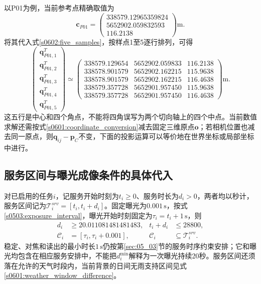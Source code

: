 以P01为例，当前参考点精确取值为
\begin{equation}
 \mathbf c_{P01}=
 \begin{pmatrix}
 338579.12965359824\\
 5652902.059832593\\
 116.2138
 \end{pmatrix}\mathrm m.
 \label{s0602:p01_center}
\end{equation}
将其代入式\eqref{s0602:five_samples}，按样点1至5逐行排列，可得
\begin{equation}
 \begin{pmatrix}
 \mathbf q_{P01,1}^T\\
 \mathbf q_{P01,2}^T\\
 \mathbf q_{P01,3}^T\\
 \mathbf q_{P01,4}^T\\
 \mathbf q_{P01,5}^T
 \end{pmatrix}
 \simeq
 \begin{pmatrix}
 338579.129654&5652902.059833&116.2138\\
 338578.901579&5652902.162215&115.9638\\
 338578.901579&5652902.162215&116.4638\\
 338579.357728&5652901.957450&115.9638\\
 338579.357728&5652901.957450&116.4638
 \end{pmatrix}\mathrm m.
 \label{s0602:p01_samples}
\end{equation}
这五行是中心和四个角点，不能将四角误写为两个切向轴上的四个中点。当前数值求解还需按式\eqref{s0601:coordinate_conversion}减去固定三维原点$\mathbf o$；若相机位置也减去同一原点，则$\mathbf q_{ij}-\mathbf p_C$不变，下面的投影运算可以等价地在世界坐标或局部坐标中进行。

\subsection{服务区间与曝光成像条件的具体代入}

对已启用的任务$i$，记服务开始时刻为$t_i\ge0$、服务时长为$d_i>0$，两者均以秒计，服务区间记为$\mathcal T_i^{srv}=[t_i,t_i+d_i]$。固定曝光为$0.001\,\mathrm s$，按式\eqref{s0503:exposure_interval}，曝光开始时刻固定为$\tau_i=t_i+1\,\mathrm s$，则
\begin{align}
 d_i&\ge20.011081481481483, &t_i+d_i&\le28800,\\
 \mathcal C_i&=[\tau_i,\tau_i+0.001],
 &\mathcal C_i&\subseteq\mathcal T_i^{srv}.
 \label{s0602:service_exposure_times}
\end{align}
稳定、对焦和读出的最小时长$1\,\mathrm s$仍按第\ref{sec:05_03}节的服务时序约束安排；它和曝光均包含在相应服务安排中，不能把$d_i^{\min}$解释为一次曝光持续20秒。服务区间还须落在允许的天气时段内，当前背景的日间无雨支持区间见式\eqref{s0601:weather_window_difference}。

